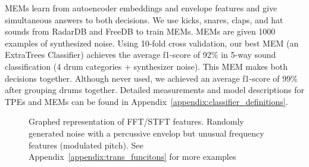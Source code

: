 \documentclass[runningheads,a4paper]{llncs}
\begin{document}
MEMs learn from autoencoder embeddings and envelope features and give simultaneous answers to both decisions. We use kicks, snares, claps, and hat sounds from RadarDB and FreeDB to train MEMs. MEMs are given 1000 examples of synthesized noise. Using 10-fold cross validation, our best MEM (an ExtraTrees Classifier) achieves the average f1-score of 92\% in 5-way sound classification (4 drum categories + synthesizer noise).  This MEM makes both decisions together. Although never used, we achieved an average f1-score of 99\% after grouping drums together. Detailed measurements and model descriptions for TPEs and MEMs can be found in Appendix~\ref{appendix:classifier_definitions}. 
\begin{figure}[tbp]
\begin{center}
\caption{Graphed representation of FFT/STFT features. Randomly generated noise with a percussive envelop but unusual frequency features (modulated pitch). See Appendix~\ref{appendix:trans_funcitons} for more examples }
\label{fig:stackspectrums}
    \end{center}
\end{figure}
\end{document}
